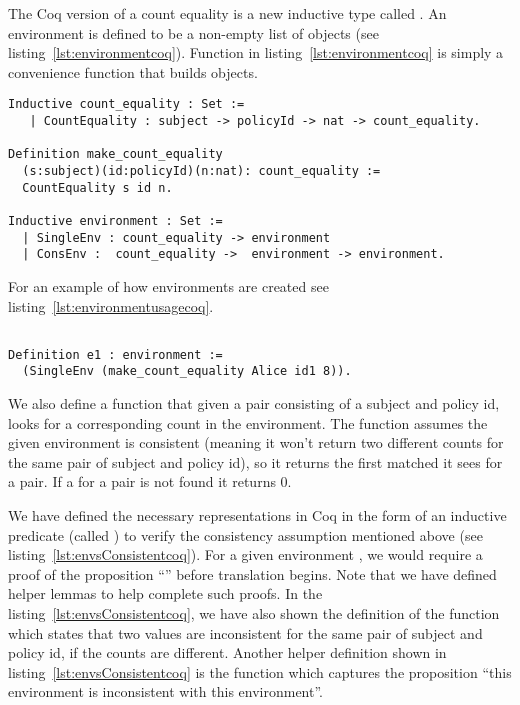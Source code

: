 The Coq version of a count equality is a new inductive type called . An environment is defined to be a non-empty list of  objects (see listing~\ref{lst:environmentcoq}). Function  in listing~\ref{lst:environmentcoq} is simply a convenience function that builds  objects. 

\begin{minipage}[c]{0.95\textwidth}
\begin{lstlisting}
Inductive count_equality : Set := 
   | CountEquality : subject -> policyId -> nat -> count_equality.

Definition make_count_equality
  (s:subject)(id:policyId)(n:nat): count_equality :=
  CountEquality s id n.
  
Inductive environment : Set := 
  | SingleEnv : count_equality -> environment
  | ConsEnv :  count_equality ->  environment -> environment.

\end{lstlisting}
\end{minipage}

For an example of how environments are created see listing~\ref{lst:environmentusagecoq}.

\begin{lstlisting}

Definition e1 : environment := 
  (SingleEnv (make_count_equality Alice id1 8)).

\end{lstlisting}
  

We also define a  function that given a pair consisting of a subject and policy id, looks for a corresponding count in the environment. The  function assumes the given environment is consistent (meaning it won't return two different counts for the same pair of subject and policy id), so it returns the first matched  it sees for a  pair. If a  for a  pair is not found it returns 0. 

We have defined the necessary representations in Coq in the form of an inductive predicate (called ) to verify the consistency assumption mentioned above (see listing~\ref{lst:envsConsistentcoq}). For a given environment , we would require a proof of the proposition ``'' before translation begins. Note that we have defined helper lemmas to help complete such proofs. In the listing~\ref{lst:envsConsistentcoq}, we have also shown the definition of the function  which states that two  values are inconsistent for the same pair of subject and policy id, if the counts are different. Another helper definition shown in listing~\ref{lst:envsConsistentcoq} is the function  which captures the proposition ``this environment is inconsistent with this environment''.

